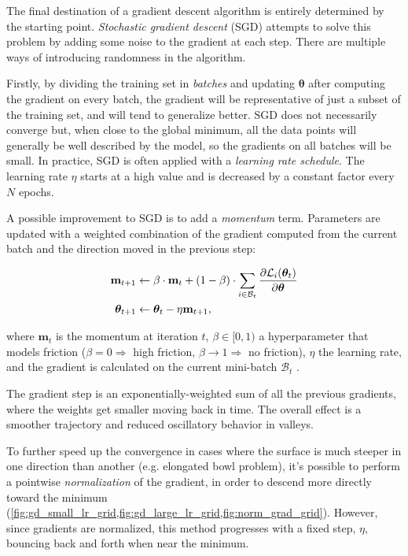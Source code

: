 The final destination of a gradient descent algorithm is entirely determined by the starting point. \textit{Stochastic gradient descent} (SGD) attempts to solve this problem by adding some noise to the gradient at each step. There are multiple ways of introducing randomness in the algorithm.

Firstly, by dividing the training set in \textit{batches} and updating $\boldsymbol{\theta}$ after computing the gradient on every batch, the gradient will be representative of just a subset of the training set, and will tend to generalize better. SGD does not necessarily converge but, when close to the global minimum, all the data points will generally be well described by the model, so the gradients on all batches will be small. In practice, SGD is often applied with a \textit{learning rate schedule}. The learning rate $\eta$ starts at a high value and is decreased by a constant factor every $N$ epochs.

A possible improvement to SGD is to add a \textit{momentum} term. Parameters are updated with a weighted combination of the gradient computed from the current batch and the direction moved in the previous step:

\begin{align}
    \mathbf{m}_{t+1} &\leftarrow \beta \cdot \mathbf{m}_t + (1-\beta) \cdot \sum_{i \in \mathcal{B}_t} \frac{\partial \mathcal{L}_i(\boldsymbol{\theta}_t)}{\partial \boldsymbol{\theta}} \notag \\
    \boldsymbol{\theta}_{t+1} &\leftarrow \boldsymbol{\theta}_t - \eta \mathbf{m}_{t+1},
    \label{eq:momentum}
\end{align}

where $\mathbf{m}_t$ is the momentum at iteration $t$, $\beta \in [0,1)$ a hyperparameter that models friction ($\beta = 0 \Rightarrow$ high friction, $\beta \rightarrow 1 \Rightarrow$ no friction), $\eta$ the learning rate, and the gradient is calculated on the current mini-batch $\mathcal{B}_t$ \cite{geron2022hands, prince2023understanding}.

The gradient step is an exponentially-weighted sum of all the previous gradients, where the weights get smaller moving back in time. The overall effect is a smoother trajectory and reduced oscillatory behavior in valleys.

To further speed up the convergence in cases where the surface is much steeper in one direction than another (e.g. elongated bowl problem), it's possible to perform a pointwise \textit{normalization} of the gradient, in order to descend more directly toward the minimum (\cref{fig:gd_small_lr_grid,fig:gd_large_lr_grid,fig:norm_grad_grid}). However, since gradients are normalized, this method progresses with a fixed step, $\eta$, bouncing back and forth when near the minimum.

